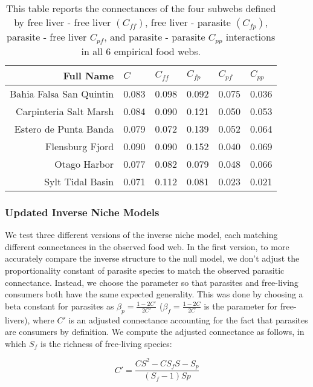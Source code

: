 \documentclass[/home/nkappler/Research/Dissertation/
 dissertation.tex]{subfiles}
\begin{document}
\begin{bibunit}
\begin{table}
        \centering
        \begin{tabular}{r l l l l l}
            \toprule
            Full Name&  $C$ &$C_{f\!f}$ &$C_{f\!p}$  &$C_{p\!f}$   &$C_{pp}$\\
            \midrule
            Bahia Falsa San Quintin&0.083&0.098&0.092&0.075&0.036\\
            Carpinteria Salt Marsh&0.084&0.090&0.121&0.050&0.053\\
            Estero de Punta Banda&0.079&0.072&0.139&0.052&0.064\\
            Flensburg Fjord&0.090&0.090&0.152&0.040&0.069\\
            Otago Harbor&0.077&0.082&0.079&0.048&0.066\\
            Sylt Tidal Basin&0.071&0.112&0.081&0.023&0.021\\
            \bottomrule
        \end{tabular}
    \caption[Subweb connectances]{This table reports the connectances of the four subwebs defined by
        free liver - free liver $(C_{f\!f})$, free liver - parasite $(C_{f\!p})$,
        parasite - free liver $C_{p\!f}$, and parasite - parasite $C_{pp}$
        interactions in all 6 empirical food
webs.\label{tab:allCs}}
\end{table}

\subsubsection{Updated Inverse Niche Models}

We test three different versions of the inverse niche model, each matching
different connectances in the observed food web. In the first version, to more
accurately compare the inverse structure to the null model, we don't adjust the
proportionality constant of parasite species to match the observed parasitic
connectance. Instead, we choose the parameter so that parasites and free-living
consumers both have the same expected generality. This was done by choosing a
beta constant for parasites as $\beta_p = \frac{1-2C'}{2C'}$ ($\beta_f =
\frac{1-2C}{2C}$ is the parameter for free-livers), where $C'$ is an adjusted
connectance accounting for the fact that parasites are consumers by definition.
We compute the adjusted connectance as follows, in which $S_f$ is the richness
of free-living species:

\begin{equation}
    C' = \frac{CS^2 - CS_fS -S_p}{(S_f-1)Sp}\label{eq:Cp0}
\end{equation}


\end{bibunit}
\end{document}
